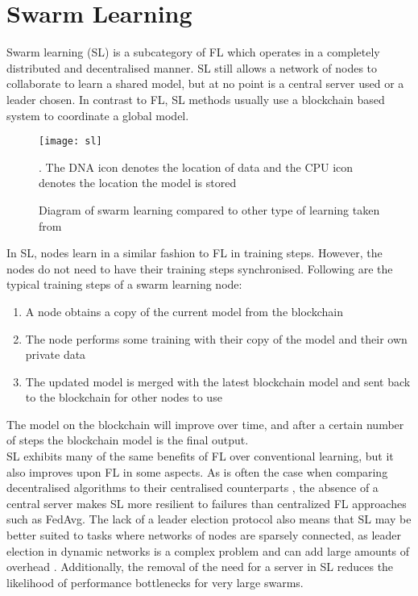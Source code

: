 \section{Swarm Learning}
Swarm learning (SL) \cite{swarm_learning} is a subcategory of FL which operates in a completely distributed and decentralised manner. SL still allows a network of nodes to collaborate to learn a shared model, but at no point is a central server used or a leader chosen. In contrast to FL, SL methods usually use a blockchain based system to coordinate a global model.

\begin{figure}[h]
	\texttt{[image: sl]}
	\caption{Diagram of swarm learning compared to other type of learning taken from \cite{swarm_learning}}. The DNA icon denotes the location of data and the CPU icon denotes the location the model is stored
	\label{fig_learning}
\end{figure}


In SL, nodes learn in a similar fashion to FL in training steps. However, the nodes do not need to have their training steps synchronised. Following are the typical training steps of a swarm learning node:
\begin{enumerate}
	\item A node obtains a copy of the current model from the blockchain
	\item The node performs some training with their copy of the model and their own private data
	\item The updated model is merged with the latest blockchain model and sent back to the blockchain for other nodes to use
\end{enumerate}
The model on the blockchain will improve over time, and after a certain number of steps the blockchain model is the final output. \\

SL exhibits many of the same benefits of FL over conventional learning, but it also improves upon FL in some aspects. As is often the case when comparing decentralised algorithms to their centralised counterparts \cite{swarm_resil}, the absence of a central server makes SL more resilient to failures than centralized FL approaches such as FedAvg. The lack of a leader election protocol also means that SL may be better suited to tasks where networks of nodes are sparsely connected, as leader election in dynamic networks is a complex problem and can add large amounts of overhead \cite{leaderelection}. Additionally, the removal of the need for a server in SL reduces the likelihood of performance bottlenecks for very large swarms.

